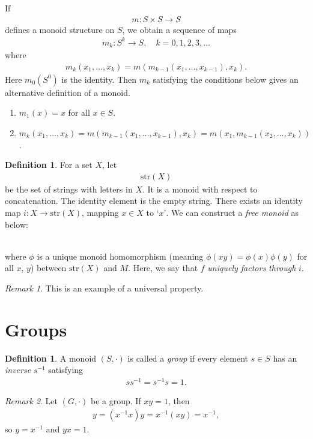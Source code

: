 \documentclass[12pt]{report}
\theoremstyle{plain}
\theoremstyle{remark}
\newtheorem*{remark}{Remark}
\theoremstyle{definition}
\newtheorem{definition}[theorem]{Definition}
\begin{document}
If
\begin{align*}
    m:S\times S\rightarrow S
\end{align*}
defines a monoid structure on $S$, we obtain a sequence of maps
\begin{align*}
    m_k:S^k\rightarrow S,\quad k=0,1,2,3,\dots
\end{align*}
where
\begin{align*}
    m_k(x_1,\dots,x_k) = m(m_{k-1}(x_1,\dots,x_{k-1}),x_k).
\end{align*}
Here $m_0(S^0)$ is the identity. Then $m_k$ satisfying the conditions below gives an alternative definition of a monoid.
\begin{enumerate}
    \item $m_1(x) = x$ for all $x\in S$.
    \item $m_k(x_1,\dots,x_k) = m(m_{k-1}(x_1,\dots,x_{k-1}),x_k) = m(x_1,m_{k-1}(x_2,\dots,x_{k}))$.
\end{enumerate}

\begin{definition}
    For a set $X$, let
    \begin{align*}
        \mathrm{str}(X)
    \end{align*}
    be the set of strings with letters in $X$. It is a monoid with respect to concatenation. The identity element is the empty string. There exists an identity map $i:X\rightarrow \mathrm{str}(X)$, mapping $x\in X$ to $\text{`$x$'}$. We can construct a \emph{free monoid} as below:
    \begin{figure}[ht]
    \centering
    \end{figure}
    \\
    where $\phi$ is a unique monoid homomorphism (meaning $\phi(xy)=\phi(x)\phi(y)$ for all $x$, $y$) between $\mathrm{str}(X)$ and $M$. Here, we say that $f$ \emph{uniquely factors through} $i$.
\end{definition}
\begin{remark}
    This is an example of a universal property.
\end{remark}


\section{Groups}
\begin{definition}
    A monoid $(S,\cdot)$ is called a \emph{group} if every element $s\in S$ has an \emph{inverse} $s^{-1}$ satisfying
    \begin{align*}
        ss^{-1} = s^{-1}s=1.
    \end{align*}
\end{definition}
\begin{remark}
    Let $(G,\cdot)$ be a group. If $xy=1$, then
    \begin{align*}
        y = (x^{-1}x)y=x^{-1}(xy)=x^{-1},
    \end{align*}
    so $y=x^{-1}$ and $yx=1$.
\end{remark}
\end{document}
